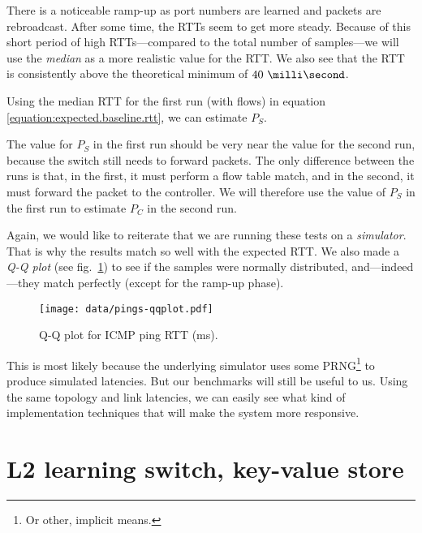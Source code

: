 

There is a noticeable ramp-up as port numbers are learned and packets are
rebroadcast.  After some time, the \acs{RTT}s seem to get more steady.
Because of this short period of high \acs{RTT}s---compared to the total number of
samples---we will use the \textit{median} as a more realistic value for the
RTT. We also see that the RTT is consistently above the theoretical minimum
of $\ms{40}$.

Using the median RTT for the first run (with flows)
in equation \ref{equation:expected.baseline.rtt}, we can estimate $P_S$.



The value for $P_S$ in the first run should be very near the value for the
second run, because the switch still needs to forward packets.  The only
difference between the runs is that, in the first, it must perform a flow
table match, and in the second, it must forward the packet to the
controller.  We will therefore use the value of $P_S$ in the first run to
estimate $P_C$ in the second run.



Again, we would like to reiterate that we are running these tests on a
\textit{simulator}.  That is why the results match so well with the expected
\acs{RTT}.  We also made a \textit{Q-Q plot} (see
fig.~\ref{figure:pings.qqplot}) to see if the samples were normally
distributed, and---indeed---they match perfectly (except for the ramp-up
phase).

\begin{figure}
  \centering
  \texttt{[image: data/pings-qqplot.pdf]}
  \caption{Q-Q plot for ICMP ping RTT (ms).}
  \label{figure:pings.qqplot}
\end{figure}

This is most likely because the underlying simulator uses some
\acf{PRNG}\footnote{Or other, implicit means.} to produce simulated latencies.  But our
benchmarks will still be useful to us.  Using the same topology and link
latencies, we can easily see what kind of implementation techniques that
will make the system more responsive.

\section{L2 learning switch, key-value store}
\label{chapter:benchmark.l2.kv.noflows}

